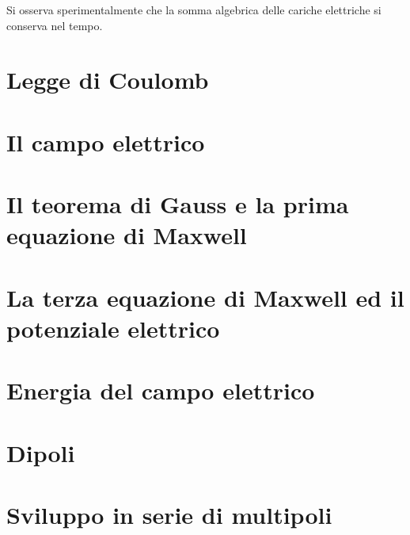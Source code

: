 \begin{obses}
    Si osserva sperimentalmente che la somma algebrica delle cariche elettriche si conserva nel tempo.
\end{obses}

\section{Legge di Coulomb}


\section{Il campo elettrico}


\section{Il teorema di Gauss e la prima equazione di Maxwell}


\section{La terza equazione di Maxwell ed il potenziale elettrico}
\label{par:potenziale_elettrico}


\section{Energia del campo elettrico}


\section{Dipoli}


\section{Sviluppo in serie di multipoli}


